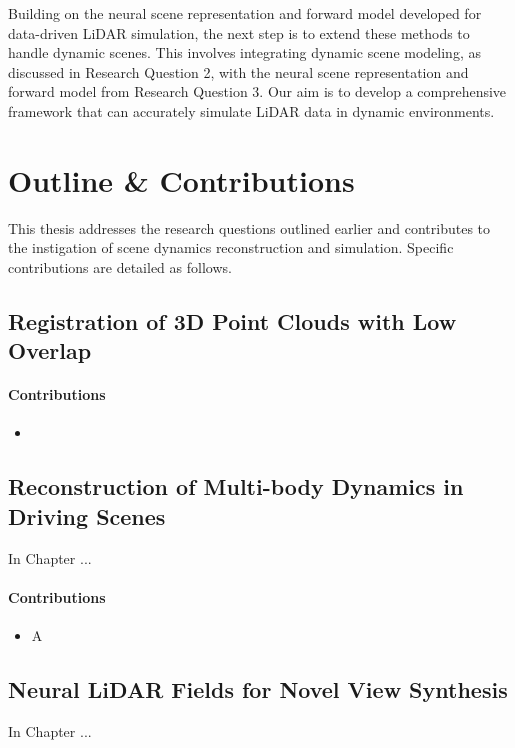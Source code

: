 Building on the neural scene representation and forward model developed for data-driven LiDAR simulation, the next step is to extend these methods to handle dynamic scenes. This involves integrating dynamic scene modeling, as discussed in Research Question 2, with the neural scene representation and forward model from Research Question 3. Our aim is to develop a comprehensive framework that can accurately simulate LiDAR data in dynamic environments.


\section{Outline \& Contributions} 
This thesis addresses the research questions outlined earlier and contributes to the instigation of scene dynamics reconstruction and simulation. Speciﬁc contributions are detailed as follows.


\subsection{Registration of 3D Point Clouds with Low Overlap}

\paragraph{Contributions}
\begin{itemize}
\item 
\end{itemize}

\subsection{Reconstruction of Multi-body Dynamics in Driving Scenes}

In Chapter ...

\paragraph{Contributions}
\begin{itemize}
\item A
\end{itemize}

\subsection{Neural LiDAR Fields for Novel View Synthesis}

In Chapter ...


